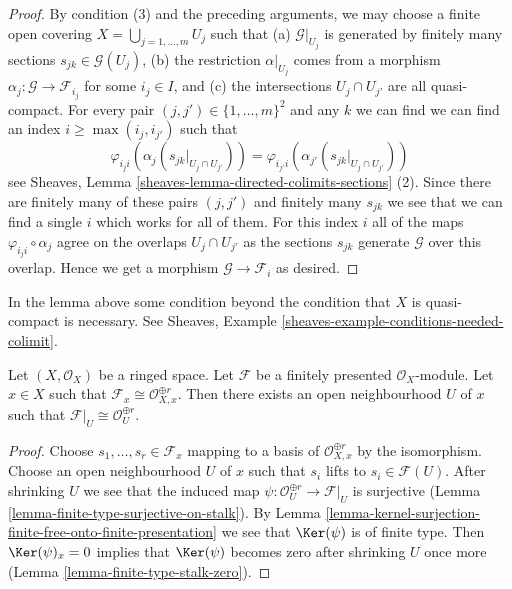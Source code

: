 \begin{proof}
\medskip\noindent
By condition (3) and the preceding arguments, we may choose
a finite open covering $X = \bigcup_{j = 1, \ldots, m} U_j$
such that (a) $\mathcal{G}|_{U_j}$ is generated by finitely
many sections $s_{jk} \in \mathcal{G}(U_j)$, (b) the restriction
$\alpha|_{U_j}$ comes from a morphism
$\alpha_j : \mathcal{G} \to \mathcal{F}_{i_j}$
for some $i_j \in I$, and (c) the intersections
$U_j \cap U_{j'}$ are all quasi-compact.
For every pair $(j, j') \in \{1, \ldots, m\}^2$
and any $k$ we can find
we can find an index $i \geq \max(i_j, i_{j'})$ such
that
$$
\varphi_{i_ji}(\alpha_j(s_{jk}|_{U_j \cap U_{j'}})) =
\varphi_{i_{j'}i}(\alpha_{j'}(s_{jk}|_{U_j \cap U_{j'}}))
$$
see Sheaves, Lemma \ref{sheaves-lemma-directed-colimits-sections} (2).
Since there are finitely many of these pairs $(j, j')$ and
finitely many $s_{jk}$ we see that we can find a single $i$
which works for all of them. For this index $i$ all of the maps
$\varphi_{i_ji} \circ \alpha_j$ agree on the overlaps $U_j \cap U_{j'}$
as the sections $s_{jk}$ generate $\mathcal{G}$ over this overlap.
Hence we get a morphism $\mathcal{G} \to \mathcal{F}_i$ as desired.
\end{proof}

\begin{remark}
\label{remark-condition-necessary}
In the lemma above some condition beyond the condition that $X$
is quasi-compact is necessary. See
Sheaves, Example \ref{sheaves-example-conditions-needed-colimit}.
\end{remark}

\begin{lemma}
\label{lemma-finite-presentation-stalk-free}
Let $(X, \mathcal{O}_X)$ be a ringed space. Let $\mathcal{F}$ be
a finitely presented $\mathcal{O}_X$-module. Let $x \in X$ such that
$\mathcal{F}_x \cong \mathcal{O}_{X, x}^{\oplus r}$. Then there exists
an open neighbourhood $U$ of $x$ such that
$\mathcal{F}|_U \cong \mathcal{O}_U^{\oplus r}$.
\end{lemma}

\begin{proof}
Choose $s_1, \ldots, s_r \in \mathcal{F}_x$ mapping to a basis of
$\mathcal{O}_{X, x}^{\oplus r}$ by the isomorphism. Choose an open
neighbourhood $U$ of $x$ such that $s_i$ lifts to $s_i \in \mathcal{F}(U)$.
After shrinking $U$ we see that the induced map
$\psi : \mathcal{O}_U^{\oplus r} \to \mathcal{F}|_U$ is surjective
(Lemma \ref{lemma-finite-type-surjective-on-stalk}).
By Lemma \ref{lemma-kernel-surjection-finite-free-onto-finite-presentation}
we see that $\Ker(\psi)$ is of finite type.
Then $\Ker(\psi)_x = 0$ implies that $\Ker(\psi)$ becomes zero
after shrinking $U$ once more (Lemma \ref{lemma-finite-type-stalk-zero}).
\end{proof}





